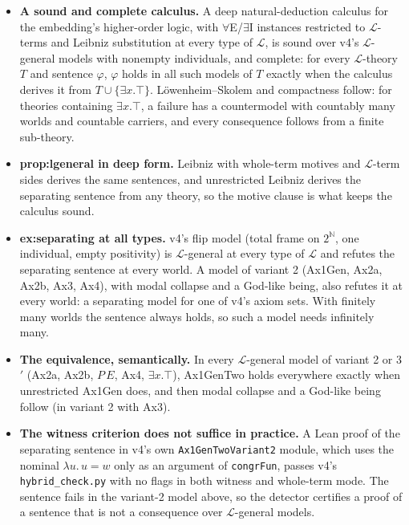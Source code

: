 \documentclass{article}
\begin{document}
\begin{itemize}
\item \textbf{A sound and complete calculus.} A deep natural-deduction calculus for the embedding's higher-order logic, with $\forall$E/$\exists$I instances restricted to $\mathcal L$-terms and Leibniz substitution at every type of $\mathcal L$, is sound over v4's $\mathcal L$-general models with nonempty individuals, and complete: for every $\mathcal L$-theory $T$ and sentence $\varphi$, $\varphi$ holds in all such models of $T$ exactly when the calculus derives it from $T\cup\{\exists x.\top\}$. Löwenheim--Skolem and compactness follow: for theories containing $\exists x.\top$, a failure has a countermodel with countably many worlds and countable carriers, and every consequence follows from a finite sub-theory.
\item \textbf{prop:lgeneral in deep form.} Leibniz with whole-term motives and $\mathcal L$-term sides derives the same sentences, and unrestricted Leibniz derives the separating sentence from any theory, so the motive clause is what keeps the calculus sound.
\item \textbf{ex:separating at all types.} v4's flip model (total frame on $2^{\mathbb N}$, one individual, empty positivity) is $\mathcal L$-general at every type of $\mathcal L$ and refutes the separating sentence at every world. A model of variant 2 (Ax1Gen, Ax2a, Ax2b, Ax3, Ax4), with modal collapse and a God-like being, also refutes it at every world: a separating model for one of v4's axiom sets. With finitely many worlds the sentence always holds, so such a model needs infinitely many.
\item \textbf{The equivalence, semantically.} In every $\mathcal L$-general model of variant 2 or 3$'$ (Ax2a, Ax2b, $P\,E$, Ax4, $\exists x.\top$), Ax1GenTwo holds everywhere exactly when unrestricted Ax1Gen does, and then modal collapse and a God-like being follow (in variant 2 with Ax3).
\item \textbf{The witness criterion does not suffice in practice.} A Lean proof of the separating sentence in v4's own \texttt{Ax1GenTwoVariant2} module, which uses the nominal $\lambda u.\,u=w$ only as an argument of \texttt{congrFun}, passes v4's \texttt{hybrid\_check.py} with no flags in both witness and whole-term mode. The sentence fails in the variant-2 model above, so the detector certifies a proof of a sentence that is not a consequence over $\mathcal L$-general models.
\end{itemize}
\end{document}
